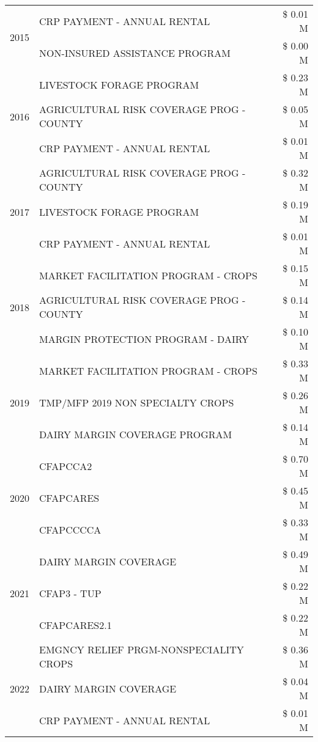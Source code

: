 \begin{tabular}{llr}
\multirow[t]{2}{*}{2015} & CRP PAYMENT - ANNUAL RENTAL & \$ 0.01 M \\
 & NON-INSURED ASSISTANCE PROGRAM & \$ 0.00 M \\
\cline{1-3}
\multirow[t]{3}{*}{2016} & LIVESTOCK FORAGE PROGRAM & \$ 0.23 M \\
 & AGRICULTURAL RISK COVERAGE PROG - COUNTY & \$ 0.05 M \\
 & CRP PAYMENT - ANNUAL RENTAL & \$ 0.01 M \\
\cline{1-3}
\multirow[t]{3}{*}{2017} & AGRICULTURAL RISK COVERAGE PROG - COUNTY & \$ 0.32 M \\
 & LIVESTOCK FORAGE PROGRAM & \$ 0.19 M \\
 & CRP PAYMENT - ANNUAL RENTAL & \$ 0.01 M \\
\cline{1-3}
\multirow[t]{3}{*}{2018} & MARKET FACILITATION PROGRAM - CROPS & \$ 0.15 M \\
 & AGRICULTURAL RISK COVERAGE PROG - COUNTY & \$ 0.14 M \\
 & MARGIN PROTECTION PROGRAM - DAIRY & \$ 0.10 M \\
\cline{1-3}
\multirow[t]{3}{*}{2019} & MARKET FACILITATION PROGRAM - CROPS & \$ 0.33 M \\
 & TMP/MFP 2019 NON SPECIALTY CROPS & \$ 0.26 M \\
 & DAIRY MARGIN COVERAGE PROGRAM & \$ 0.14 M \\
\cline{1-3}
\multirow[t]{3}{*}{2020} & CFAPCCA2 & \$ 0.70 M \\
 & CFAPCARES & \$ 0.45 M \\
 & CFAPCCCCA & \$ 0.33 M \\
\cline{1-3}
\multirow[t]{3}{*}{2021} & DAIRY MARGIN COVERAGE & \$ 0.49 M \\
 & CFAP3 - TUP & \$ 0.22 M \\
 & CFAPCARES2.1 & \$ 0.22 M \\
\cline{1-3}
\multirow[t]{3}{*}{2022} & EMGNCY RELIEF PRGM-NONSPECIALITY CROPS & \$ 0.36 M \\
 & DAIRY MARGIN COVERAGE & \$ 0.04 M \\
 & CRP PAYMENT - ANNUAL RENTAL & \$ 0.01 M \\
\cline{1-3}
\bottomrule
\end{tabular}

